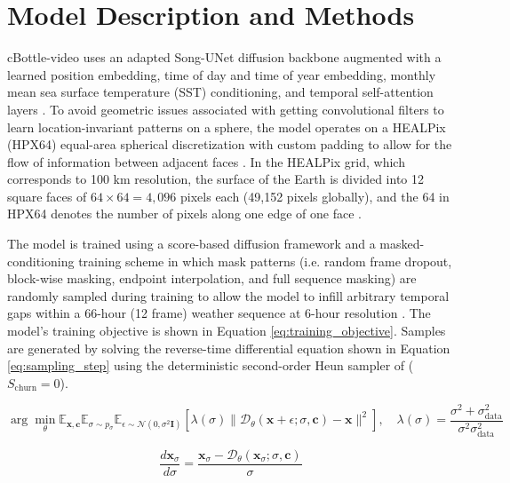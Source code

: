 \documentclass[final]{agujournal2019}
\begin{document}
\section{Model Description and Methods}

cBottle-video uses an adapted Song-UNet diffusion backbone augmented with a learned position embedding, time of day and time of year embedding, monthly mean sea surface temperature (SST) conditioning, and temporal self-attention layers \cite{Song2020-hs, Karras2022-xq, Ho2022-lf, Blattmann2023-zo, Brenowitz2025-mz}. To avoid geometric issues associated with getting convolutional filters to learn location-invariant patterns on a sphere, the model operates on a HEALPix (HPX64) equal-area spherical discretization with custom padding to allow for the flow of information between adjacent faces \cite{Karlbauer2024-nv}. In the HEALPix grid, which corresponds to 100 km resolution, the surface of the Earth is divided into 12 square faces of $64\times64=4{,}096$ pixels each (49,152 pixels globally), and the 64 in HPX64 denotes the number of pixels along one edge of one face \cite{Karlbauer2024-nv, Brenowitz2025-mz}.

The model is trained using a score-based diffusion framework and a masked-conditioning training scheme in which mask patterns (i.e. random frame dropout, block-wise masking, endpoint interpolation, and full sequence masking) are randomly sampled during training to allow the model to infill arbitrary temporal gaps within a 66-hour (12 frame) weather sequence at 6-hour resolution \cite{Song2020-hs, voleti2022MCVD, Brenowitz2025-mz}. The model's training objective is shown in Equation \ref{eq:training_objective}. Samples are generated by solving the reverse-time differential equation shown in Equation \ref{eq:sampling_step} using the deterministic second-order Heun sampler of  ($S_{\text{churn}} = 0$). 

\begin{equation}
\label{eq:training_objective}
\arg\min_{\theta} \mathbb{E}_{\mathbf{x},\mathbf{c}} \mathbb{E}_{\sigma \sim p_\sigma} \mathbb{E}_{\epsilon \sim \mathcal{N}(0, \sigma^2 \mathbf{I})} \left[ \lambda(\sigma) \| \mathcal{D}_\theta(\mathbf{x} + \epsilon; \sigma, \mathbf{c}) - \mathbf{x} \|^2 \right], \quad \lambda(\sigma) = \frac{\sigma^2 + \sigma_{\text{data}}^2}{\sigma^2\sigma_{\text{data}}^2}
\end{equation}

\begin{equation}
\label{eq:sampling_step}
\frac{d\mathbf{x}_\sigma}{d\sigma} = \frac{\mathbf{x}_\sigma - \mathcal{D}_\theta(\mathbf{x}_\sigma; \sigma, \mathbf{c})}{\sigma}
\end{equation}
\end{document}
